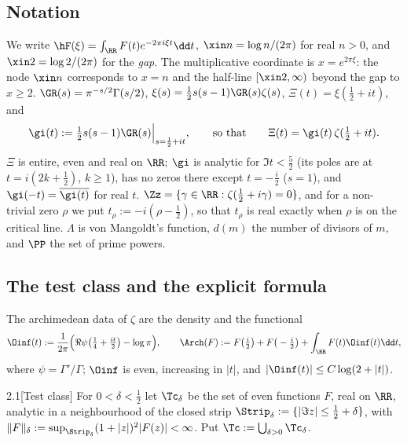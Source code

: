\subsection{Notation}\label{ssec:notation}

We write $\hF(\xi)=\int_\RR F(t)e^{-2\pi i\xi t}\dd t$, $\xin n=\log n/(2\pi)$ for real $n>0$, and $\xin2=\log2/(2\pi)$ for the
\emph{gap}. The multiplicative coordinate is $x=e^{2\pi\xi}$: the node $\xin n$ corresponds to $x=n$ and the half-line $[\xin2,\infty)$
beyond the gap to $x\ge2$. $\GR(s)=\pi^{-s/2}\Gamma(s/2)$, $\xi(s)=\frac12s(s-1)\GR(s)\zeta(s)$, $\Xi(t)=\xi(\frac12+it)$, and
\begin{equation}\label{eq:gi}
\gi(t):=\tfrac12s(s-1)\GR(s)\Big|_{s=\frac12+it},\qquad\text{so that}\qquad \Xi(t)=\gi(t)\,\zeta(\tfrac12+it).
\end{equation}
$\Xi$ is entire, even and real on $\RR$; $\gi$ is analytic for $\Im t<\frac52$ (its poles are at $t=i(2k+\frac12)$, $k\ge1$), has no
zeros there except $t=-\frac i2$ ($s=1$), and $\gi(-t)=\overline{\gi(t)}$ for real $t$. $\Zz=\{\gamma\in\RR:\zeta(\frac12+i\gamma)=0\}$, and
for a non-trivial zero $\rho$ we put $t_\rho:=-i(\rho-\frac12)$, so that $t_\rho$ is real exactly when $\rho$ is on the critical line.
$\Lambda$ is von Mangoldt's function, $d(m)$ the number of divisors of $m$, and $\PP$ the set of prime powers.

\subsection{The test class and the explicit formula}

The archimedean data of $\zeta$ are the density and the functional
\begin{equation}\label{eq:Arch}
\Oinf(t):=\frac1{2\pi}\Big(\Re\psi\big(\tfrac14+\tfrac{it}2\big)-\log\pi\Big),\qquad
\Arch(F):=F\big(\tfrac i2\big)+F\big(-\tfrac i2\big)+\int_\RR F(t)\Oinf(t)\dd t,
\end{equation}
where $\psi=\Gamma'/\Gamma$; $\Oinf$ is even, increasing in $|t|$, and $|\Oinf(t)|\le C\log(2+|t|)$.

\begin{Idefinition}{2.1}[Test class]\label{def:testclass}
For $0<\delta<\frac12$ let $\Tc_\delta$ be the set of even functions $F$, real on $\RR$, analytic in a neighbourhood of the closed strip
$\Strip_\delta:=\{|\Im z|\le\frac12+\delta\}$, with $\|F\|_\delta:=\sup_{\Strip_\delta}(1+|z|)^2|F(z)|<\infty$. Put $\Tc:=\bigcup_{\delta>0}\Tc_\delta$.
\end{Idefinition}

